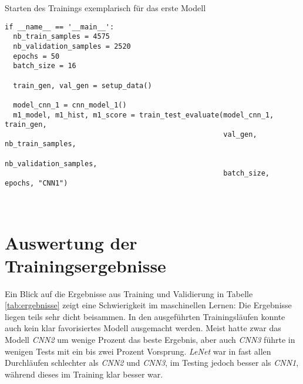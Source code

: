 \begin{listing} [ht]
	\caption{Starten des Trainings exemplarisch für das erste Modell}
	\label{lst:start-training}
	\begin{verbatim}
if __name__ == '__main__':
  nb_train_samples = 4575
  nb_validation_samples = 2520
  epochs = 50
  batch_size = 16

  train_gen, val_gen = setup_data()

  model_cnn_1 = cnn_model_1()
  m1_model, m1_hist, m1_score = train_test_evaluate(model_cnn_1, train_gen,
                                                    val_gen, nb_train_samples,
                                                    nb_validation_samples,
                                                    batch_size, epochs, "CNN1")
	\end{verbatim}
\end{listing} \ \\

\section{Auswertung der Trainingsergebnisse}
Ein Blick auf die Ergebnisse aus Training und Validierung in Tabelle \ref{tab:ergebnisse} zeigt eine Schwierigkeit im maschinellen Lernen: Die Ergebnisse liegen teils sehr dicht beisammen. In den ausgeführten Trainingsläufen konnte auch kein klar favorisiertes Modell ausgemacht werden. Meist hatte zwar das Modell \textit{CNN2} um wenige Prozent das beste Ergebnis, aber auch \textit{CNN3} führte in wenigen Tests mit ein bis zwei Prozent Vorsprung. \textit{LeNet} war in fast allen Durchläufen schlechter als \textit{CNN2} und \textit{CNN3}, im Testing jedoch besser als \textit{CNN1}, während dieses im Training klar besser war.

